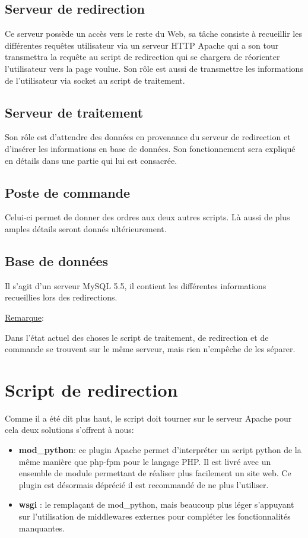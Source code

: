 \subsection*{Serveur de redirection}

Ce serveur possède un accès vers le reste du Web, sa tâche consiste à recueillir les différentes requêtes utilisateur via un serveur HTTP Apache qui a son tour transmettra la requête au script de redirection qui se chargera de réorienter l'utilisateur vers la page voulue.
Son rôle est aussi de transmettre les informations de l'utilisateur via socket au script de traitement. 

\subsection*{Serveur de traitement}
Son rôle est d'attendre des données en provenance du serveur de redirection et d'insérer les informations en base de données. Son fonctionnement sera expliqué en détails dans une partie qui lui est consacrée.


\subsection*{Poste de commande}
Celui-ci permet de donner des ordres aux deux autres scripts. Là aussi de plus amples détails seront donnés ultérieurement.

\subsection*{Base de données}
Il s'agit d'un serveur MySQL 5.5, il contient les différentes informations recueillies lors des redirections.

\underline{Remarque}:

Dans l'état actuel des choses le script de traitement, de redirection et de commande se trouvent sur le même serveur, mais rien n'empêche de les séparer.

\newpage

\section*{Script de redirection}
Comme il a été dit plus haut, le script doit tourner sur le serveur Apache pour cela deux solutions s'offrent à nous:
\begin{itemize}
\item \textbf{mod\_python}: ce plugin Apache permet d'interpréter un script python de la même manière que php-fpm pour le langage PHP. Il est livré avec un ensemble de module permettant de réaliser plus facilement un site web. Ce plugin est désormais déprécié il est recommandé de ne plus l'utiliser.
\item \textbf{wsgi} : le remplaçant de mod\_python, mais beaucoup plus léger s'appuyant sur l'utilisation de middlewares externes pour compléter les fonctionnalités manquantes.  
\end{itemize}
 
